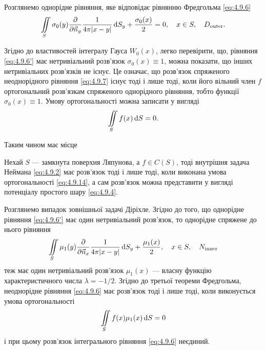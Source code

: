 Розглянемо однорідне рівняння, яке відповідає рівнянню Фредгольма \eqref{eq:4.9.6}
\begin{equation}
	\label{eq:4.9.6'}
	\displaystyle\iint\limits_S \sigma_0(y) \frac{\partial}{\partial \vec n_y} \frac{1}{4 \pi |x - y|} \mathop{}\!\mathrm{d} S_y + \frac{\sigma_0(x)}{2} = 0, \quad x \in S, \quad D_{\text{outer}}.
\end{equation}

Згідно до властивостей інтегралу Гауса $W_0(x)$, легко перевірити, що, рівняння \eqref{eq:4.9.6'} має нетривіальний розв'язок $\sigma_0(x) \equiv 1$, можна показати, що інших нетривіальних розв'язків не існує. Це означає, що розв'язок спряженого неоднорідного рівняння \eqref{eq:4.9.7} існує тоді і лише тоді, коли його вільний член $f$ ортогональний розв'язкам спряженого однорідного рівняння, тобто функції $\sigma_0(x) \equiv 1$. Умову ортогональності можна записати у вигляді 
\begin{equation}
	\label{eq:4.9.14}
	\displaystyle\iint\limits_S f(x) \mathop{}\!\mathrm{d} S = 0.
\end{equation}

Таким чином має місце

\begin{theorem}
	Нехай $S$ --- замкнута поверхня Ляпунова, а $f \in C(S)$, тоді внутрішня задача Неймана \eqref{eq:4.9.2} має розв'язок тоді і лише тоді, коли виконана умова ортогональності \eqref{eq:4.9.14}, а сам розв'язок можна представити у вигляді потенціалу простого шару \eqref{eq:4.9.4}.
\end{theorem}

Розглянемо випадок зовнішньої задачі Діріхле. Згідно до того, що однорідне рівняння \eqref{eq:4.9.6'} має один нетривіальний розв'язок, то однорідне спряжене до нього рівняння
\begin{equation}
	\label{eq:4.9.7'}
	\displaystyle\iint\limits_S \mu_1(y) \frac{\partial}{\partial \vec n_x} \frac{1}{4 \pi |x - y|} \mathop{}\!\mathrm{d} S_y + \frac{\mu_1(x)}{2}, \quad x \in S, \quad N_{\text{inner}}
\end{equation}
теж має один нетривіальний розв'язок $\mu_1(x)$ --- власну функцію характеристичного числа $\lambda = -1/2$. Згідно до третьої теореми Фредгольма, неоднорідне рівняння \eqref{eq:4.9.6} має розв'язок тоді і лише тоді, коли виконується умова ортогональності
\begin{equation}
	\displaystyle\iint\limits_S f(x) \mu_1(x) \mathop{}\!\mathrm{d} S = 0
\end{equation}
і при цьому розв'язок інтегрального рівняння \eqref{eq:4.9.6} неєдиний. \medskip

